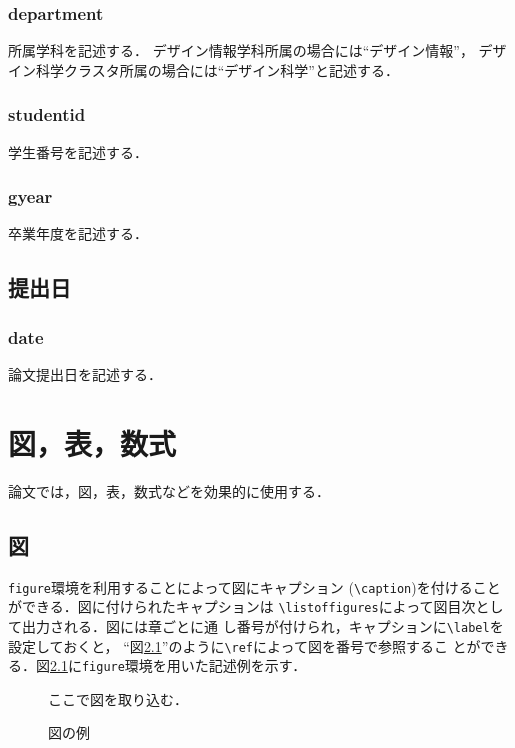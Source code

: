 \documentclass[11pt]{jreport}
\begin{document}
\subsection{department}
所属学科を記述する．
デザイン情報学科所属の場合には``デザイン情報''，
デザイン科学クラスタ所属の場合には``デザイン科学''と記述する．

\subsection{studentid}
学生番号を記述する．

\subsection{gyear}
卒業年度を記述する．

\section{提出日}
\subsection{date}
論文提出日を記述する．


\chapter{図，表，数式}\label{chap:fig-tab-exp}

論文では，図，表，数式などを効果的に使用する．

\section{図}

{\tt figure}環境を利用することによって図にキャプション
(\verb|\caption|)を付けることができる．図に付けられたキャプションは
\verb|\listoffigures|によって図目次として出力される．図には章ごとに通
し番号が付けられ，キャプションに\verb|\label|を設定しておくと，
``図\ref{fig:sample}''のように\verb|\ref|によって図を番号で参照するこ
とができる．図\ref{fig:sample}に{\tt figure}環境を用いた記述例を示す．

\begin{figure}
  \begin{center}
    ここで図を取り込む．
  \end{center}
  \caption{図の例}
  \label{fig:sample}
\end{figure}
\end{document}

